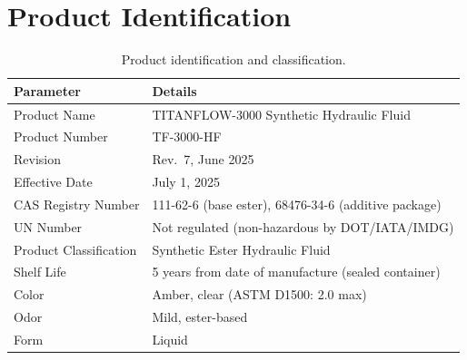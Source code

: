 \documentclass[
    language=english,
    doctype=data-sheet,
    institution=none,
]{../../omnilatex}
\begin{document}
\maketitle

\begin{abstract}
This technical data sheet provides comprehensive physical, chemical, and
performance specifications for TITANFLOW-3000, a high-performance hydraulic
fluid engineered for aerospace and industrial applications. TITANFLOW-3000
meets or exceeds MIL-PRF-83282, ISO 15380 Type HEES, and Airbus AIMS 09-10
specifications. The fluid is based on a synthetic ester base stock with
proprietary additive technology for enhanced oxidative stability, anti-wear
protection, and low-temperature fluidity. This document covers product
description, compositional information, physical properties, performance
characteristics, handling and storage requirements, and regulatory compliance.
\end{abstract}

\section{Product Identification}
\label{sec:identification}

\begin{table}[htbp]
    \centering
    \caption{Product identification and classification.}
    \label{tab:identification}
    \begin{tabular}{@{}p{5cm}p{9cm}@{}}
        \toprule
        \textbf{Parameter} & \textbf{Details} \\
        \midrule
        Product Name          & TITANFLOW-3000 Synthetic Hydraulic Fluid \\
        Product Number        & TF-3000-HF \\
        Revision              & Rev.\ 7, June 2025 \\
        Effective Date        & July 1, 2025 \\
        CAS Registry Number  & 111-62-6 (base ester), 68476-34-6 (additive package) \\
        UN Number             & Not regulated (non-hazardous by DOT/IATA/IMDG) \\
        Product Classification & Synthetic Ester Hydraulic Fluid \\
        Shelf Life            & 5 years from date of manufacture (sealed container) \\
        Color                 & Amber, clear (ASTM D1500: 2.0 max) \\
        Odor                  & Mild, ester-based \\
        Form                  & Liquid \\
        \bottomrule
    \end{tabular}
\end{table}
\end{document}
